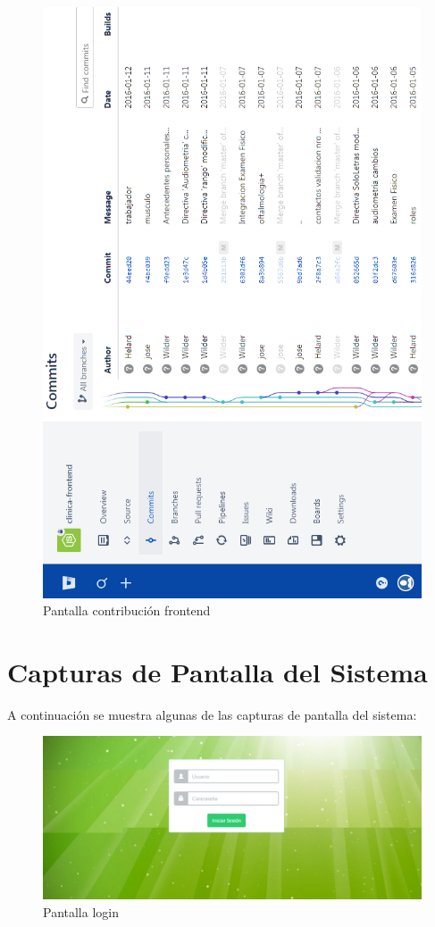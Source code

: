 			\begin{figure}[H]
			    \centering
				\includegraphics[width=13cm]{../imgs/ui/bitbucket-front.png}
				\caption{Pantalla contribución frontend}
				\label{figure:bitbucket-front}
			\end{figure}
		
		\section{Capturas de Pantalla del Sistema}
			A continuación se muestra algunas de las capturas de pantalla del sistema:
			
			\begin{figure}[H]
			    \centering
				\includegraphics[width=18cm]{../imgs/ui/login.png}
				\caption{Pantalla login}
				\label{figure:login}
			\end{figure}
			
